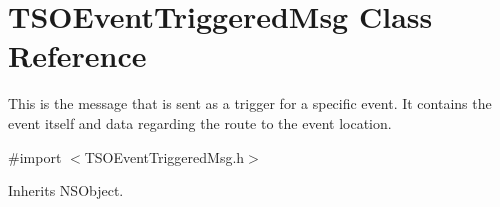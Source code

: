 \hypertarget{interface_t_s_o_event_triggered_msg}{}\section{T\+S\+O\+Event\+Triggered\+Msg Class Reference}
\label{interface_t_s_o_event_triggered_msg}


This is the message that is sent as a trigger for a specific event. It contains the event itself and data regarding the route to the event location.  




{\ttfamily \#import $<$T\+S\+O\+Event\+Triggered\+Msg.\+h$>$}



Inherits N\+S\+Object.

